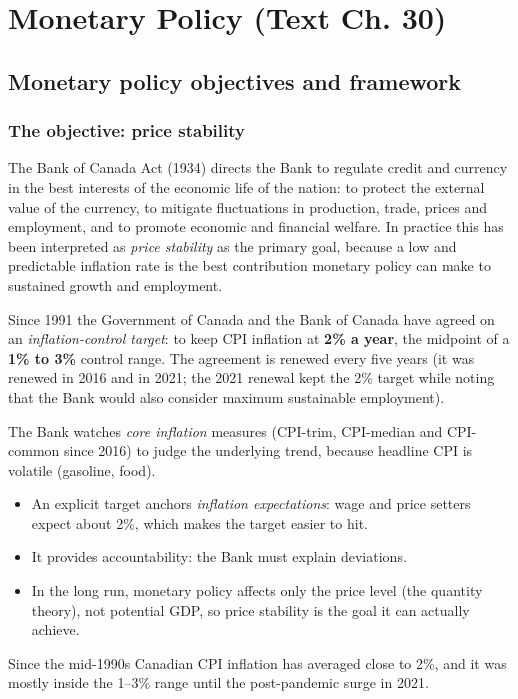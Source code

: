 \chapter{Monetary Policy (Text Ch. 30)}

\section{Monetary policy objectives and framework}

\subsection{The objective: price stability}

The Bank of Canada Act (1934) directs the Bank to regulate credit and currency in the best
interests of the economic life of the nation: to protect the external value of the
currency, to mitigate fluctuations in production, trade, prices and employment, and to
promote economic and financial welfare. In practice this has been interpreted as
\emph{price stability} as the primary goal, because a low and predictable inflation rate
is the best contribution monetary policy can make to sustained growth and employment.

\begin{definition}
Since 1991 the Government of Canada and the Bank of Canada have agreed on an
\emph{inflation-control target}: to keep CPI inflation at \textbf{2\% a year}, the midpoint
of a \textbf{1\% to 3\%} control range. The agreement is renewed every five years (it was
renewed in 2016 and in 2021; the 2021 renewal kept the 2\% target while noting that the
Bank would also consider maximum sustainable employment).
\end{definition}

The Bank watches \emph{core inflation} measures (CPI-trim, CPI-median and CPI-common since
2016) to judge the underlying trend, because headline CPI is volatile (gasoline, food).

\begin{remark}
\begin{itemize}
  \item An explicit target anchors \emph{inflation expectations}: wage and price
        setters expect about 2\%, which makes the target easier to hit.
  \item It provides accountability: the Bank must explain deviations.
  \item In the long run, monetary policy affects only the price level (the quantity
        theory), not potential GDP, so price stability is the goal it can actually achieve.
\end{itemize}
Since the mid-1990s Canadian CPI inflation has averaged close to 2\%, and it was mostly
inside the 1--3\% range until the post-pandemic surge in 2021.
\end{remark}

